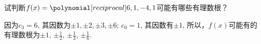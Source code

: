 \begin{example}
    试判断$f(x)=\poly{6,1,-4,1}$可能有哪些有理数根？
\end{example}

\begin{solution}
    因为$c_3=6$, 其因数为$\pm 1,\pm 2,\pm 3,\pm 6$; 
    $c_0=1$, 其因数有$\pm 1$, 所以，$f(x)$可能有的有理数根为$\pm 1$,
    $\pm\frac{1}{2}$, $\pm \frac{1}{3}$, $\pm \frac{1}{6}$.
\end{solution}






\begin{example}
    
\end{example}

\begin{solution}
    
\end{solution}


\begin{example}
    
\end{example}

\begin{solution}
    
\end{solution}

\begin{example}
    
\end{example}

\begin{solution}
    
\end{solution}

\begin{example}
    
\end{example}

\begin{solution}
    
\end{solution}

\begin{example}
    
\end{example}

\begin{solution}
    
\end{solution}



